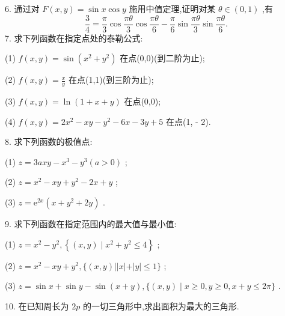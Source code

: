 \hspace*{4em} 6. 通过对 \(F\left( {x,y}\right)  = \sin x\cos y\) 施用中值定理,证明对某 \(\theta  \in  \left( {0,1}\right)\) ,有
\[
\frac{3}{4} = \frac{\pi }{3}\cos \frac{\pi \theta }{3}\cos \frac{\pi \theta }{6} - \frac{\pi }{6}\sin \frac{\pi \theta }{3}\sin \frac{\pi \theta }{6}.
\]
 7. 求下列函数在指定点处的泰勒公式:

\hspace*{4em} (1) \(f\left( {x,y}\right)  = \sin \left( {{x}^{2} + {y}^{2}}\right)\) 在点(0,0)(到二阶为止);

\hspace*{4em} (2) \(f\left( {x,y}\right)  = \frac{x}{y}\) 在点(1,1)(到三阶为止);

\hspace*{4em} (3) \(f\left( {x,y}\right)  = \ln \left( {1 + x + y}\right)\) 在点(0,0);

\hspace*{4em} (4) \(f\left( {x,y}\right)  = 2{x}^{2} - {xy} - {y}^{2} - {6x} - {3y} + 5\) 在点(1, - 2).

\hspace*{4em} 8. 求下列函数的极值点:

\hspace*{4em} (1) \(z = {3axy} - {x}^{3} - {y}^{3}\left( {a > 0}\right)\) ;

\hspace*{4em} (2) \(z = {x}^{2} - {xy} + {y}^{2} - {2x} + y\) ;

\hspace*{4em} (3) \(z = {\mathrm{e}}^{2x}\left( {x + {y}^{2} + {2y}}\right)\) .

\hspace*{4em} 9. 求下列函数在指定范围内的最大值与最小值:

\hspace*{4em} (1) \(z = {x}^{2} - {y}^{2},\left\{  {\left( {x,y}\right)  \mid  {x}^{2} + {y}^{2} \leq  4}\right\}\) ;

\hspace*{4em} (2) \(z = {x}^{2} - {xy} + {y}^{2},\{ \left( {x,y}\right) \left| \right| x\left| +\right| y \mid   \leq  1\}\) ;

\hspace*{4em} (3) \(z = \sin x + \sin y - \sin \left( {x + y}\right) ,\{ \left( {x,y}\right)  \mid  x \geq  0,y \geq  0,x + y \leq  {2\pi }\}\) .

\hspace*{4em} 10. 在已知周长为 \({2p}\) 的一切三角形中,求出面积为最大的三角形.


